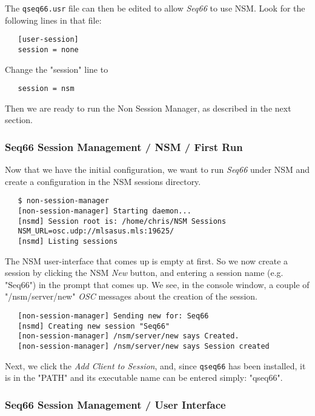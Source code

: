    The \texttt{qseq66.usr} file can then be edited to allow \textsl{Seq66} to
   use NSM.  Look for the following lines in that file:

\begin{verbatim}
   [user-session]
   session = none
\end{verbatim}

   Change the "session" line to

\begin{verbatim}
   session = nsm
\end{verbatim}

   Then we are ready to run the Non Session Manager, as described in the next
   section.

\subsubsection{Seq66 Session Management / NSM / First Run}
\label{subsec:sessions_nsm}

   Now that we have the initial configuration, we want to run \textsl{Seq66}
   under NSM and create a configuration in the NSM sessions directory.

\begin{verbatim}
   $ non-session-manager
   [non-session-manager] Starting daemon...
   [nsmd] Session root is: /home/chris/NSM Sessions
   NSM_URL=osc.udp://mlsasus.mls:19625/
   [nsmd] Listing sessions
\end{verbatim}

   The NSM user-interface that comes up is empty at first.  So we now create a
   session by clicking the NSM \textsl{New} button, and entering a session name
   (e.g. "Seq66") in the prompt that comes up.  We see, in the console window,
   a couple of
   "/nsm/server/new" \textsl{OSC} messages about the creation of the session.

\begin{verbatim}
   [non-session-manager] Sending new for: Seq66
   [nsmd] Creating new session "Seq66"
   [non-session-manager] /nsm/server/new says Created.
   [non-session-manager] /nsm/server/new says Session created
\end{verbatim}

   Next, we click the \textsl{Add Client to Session}, and, since
   \texttt{qseq66} has been installed, it is in the "PATH" and its executable
   name can be entered simply: "qseq66".



\subsubsection{Seq66 Session Management / User Interface}
\label{subsubsec:sessions_ui}

